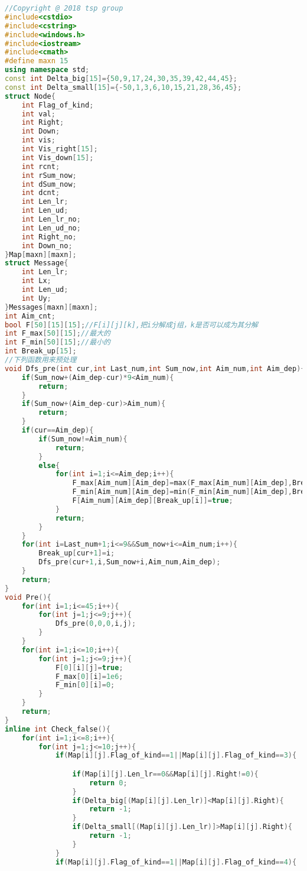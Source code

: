 
\begin{lstlisting}[language=C++, firstnumber=1, basicstyle=\tiny]
//Copyright @ 2018 tsp group
#include<cstdio>
#include<cstring>
#include<windows.h>
#include<iostream>
#include<cmath>
#define maxn 15
using namespace std;
const int Delta_big[15]={50,9,17,24,30,35,39,42,44,45};
const int Delta_small[15]={-50,1,3,6,10,15,21,28,36,45};
struct Node{
    int Flag_of_kind;
    int val;
    int Right;
    int Down;
    int vis;
    int Vis_right[15];
    int Vis_down[15];
    int rcnt;
    int rSum_now;
    int dSum_now;
    int dcnt;
    int Len_lr;
    int Len_ud;
    int Len_lr_no;
    int Len_ud_no;
    int Right_no;
    int Down_no;
}Map[maxn][maxn];
struct Message{
    int Len_lr;
    int Lx;
    int Len_ud;
    int Uy;
}Messages[maxn][maxn];
int Aim_cnt;
bool F[50][15][15];//F[i][j][k],把i分解成j组，k是否可以成为其分解
int F_max[50][15];//最大的
int F_min[50][15];//最小的
int Break_up[15];
//下列函数用来预处理
void Dfs_pre(int cur,int Last_num,int Sum_now,int Aim_num,int Aim_dep){
    if(Sum_now+(Aim_dep-cur)*9<Aim_num){
        return;
    }
    if(Sum_now+(Aim_dep-cur)>Aim_num){
        return;
    }
    if(cur==Aim_dep){
        if(Sum_now!=Aim_num){
            return;
        }
        else{
            for(int i=1;i<=Aim_dep;i++){
                F_max[Aim_num][Aim_dep]=max(F_max[Aim_num][Aim_dep],Break_up[i]);
                F_min[Aim_num][Aim_dep]=min(F_min[Aim_num][Aim_dep],Break_up[i]);
                F[Aim_num][Aim_dep][Break_up[i]]=true;
            }
            return;
        }
    }
    for(int i=Last_num+1;i<=9&&Sum_now+i<=Aim_num;i++){
        Break_up[cur+1]=i;
        Dfs_pre(cur+1,i,Sum_now+i,Aim_num,Aim_dep);
    }
    return;
}
void Pre(){
    for(int i=1;i<=45;i++){
        for(int j=1;j<=9;j++){
            Dfs_pre(0,0,0,i,j);
        }
    }
    for(int i=1;i<=10;i++){
        for(int j=1;j<=9;j++){
            F[0][i][j]=true;
            F_max[0][i]=1e6;
            F_min[0][i]=0;
        }
    }
    return;
}
inline int Check_false(){
    for(int i=1;i<=8;i++){
        for(int j=1;j<=10;j++){
            if(Map[i][j].Flag_of_kind==1||Map[i][j].Flag_of_kind==3){

                if(Map[i][j].Len_lr==0&&Map[i][j].Right!=0){
                    return 0;
                }
                if(Delta_big[(Map[i][j].Len_lr)]<Map[i][j].Right){
                    return -1;
                }
                if(Delta_small[(Map[i][j].Len_lr)]>Map[i][j].Right){
                    return -1;
                }
            }
            if(Map[i][j].Flag_of_kind==1||Map[i][j].Flag_of_kind==4){


\end{lstlisting}
